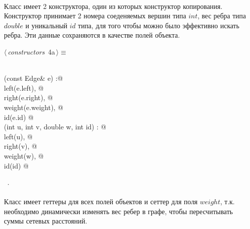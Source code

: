 \documentclass[12pt]{article}
\begin{document}
\paragraph{}
Класс имеет 2 конструктора, один из которых конструктор копирования.
Конструктор принимает 2 номера соеденяемых вершин типа $int$, 
вес ребра типа $double$ и уникальный $id$ типа, для того чтобы 
можно было эффективно искать ребра. Эти данные сохраняются в качестве
полей объекта. 

\begin{flushleft} \small
\begin{minipage}{\linewidth}\label{scrap2}\raggedright\small
{} $\langle\,${\itshape constructors}\nobreak\ {\footnotesize {4a}}$\,\rangle\equiv$
\vspace{-1ex}
\begin{list}{}{} \item
\mbox{}\verb@@\\
\mbox{}\verb@Edge(const Edge& e) :@\\
\mbox{}\verb@    left(e.left), @\\
\mbox{}\verb@    right(e.right), @\\
\mbox{}\verb@    weight(e.weight), @\\
\mbox{}\verb@    id(e.id) { }@\\
\mbox{}\verb@Edge(int u, int v, double w, int id) : @\\
\mbox{}\verb@    left(u), @\\
\mbox{}\verb@    right(v), @\\
\mbox{}\verb@    weight(w), @\\
\mbox{}\verb@    id(id) { }@\\
\mbox{}\verb@@{\NWsep}
\end{list}
\vspace{-1.5ex}
\footnotesize
\begin{list}{}{\setlength{\itemsep}{-\parsep}\setlength{\itemindent}{-\leftmargin}}
\item \NWtxtMacroRefIn\ .

\item{}
\end{list}
\end{minipage}\vspace{4ex}
\end{flushleft}
\paragraph{}
Класс имеет геттеры для всех полей объектов и сеттер для поля $weight$, т.к.
необходимо динамически изменять вес ребер в графе, чтобы пересчитывать суммы сетевых расстояний.
\end{document}
